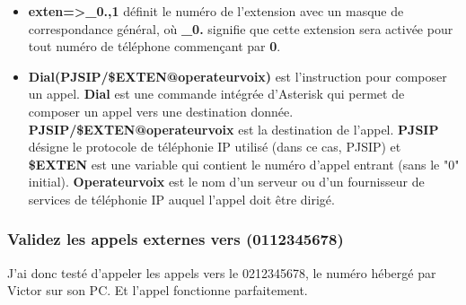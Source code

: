 \documentclass[12pt, a4paper]{article}
\begin{document}
	\begin{itemize}
		\item \textbf{exten=>\_0.,1} définit le numéro de l'extension avec un masque de correspondance général, où \textbf{\_0.} signifie que cette extension sera activée pour tout numéro de téléphone commençant par \textbf{0}.\\
		\item \textbf{Dial(PJSIP/\${EXTEN}@operateurvoix)} est l'instruction pour composer un appel. \textbf{Dial} est une commande intégrée d'Asterisk qui permet de composer un appel vers une destination donnée. \textbf{PJSIP/\${EXTEN}@operateurvoix} est la destination de l'appel. \textbf{PJSIP} désigne le protocole de téléphonie IP utilisé (dans ce cas, PJSIP) et \textbf{\${EXTEN}} est une variable qui contient le numéro d'appel entrant (sans le "0" initial). \textbf{Operateurvoix} est le nom d'un serveur ou d'un fournisseur de services de téléphonie IP auquel l'appel doit être dirigé.
	\end{itemize}

	\subsubsection{Validez les appels externes vers (0112345678)}
	J'ai donc testé d'appeler les appels vers le 0212345678, le numéro hébergé par
	Victor sur son PC. Et l'appel fonctionne parfaitement. 
\end{document}
